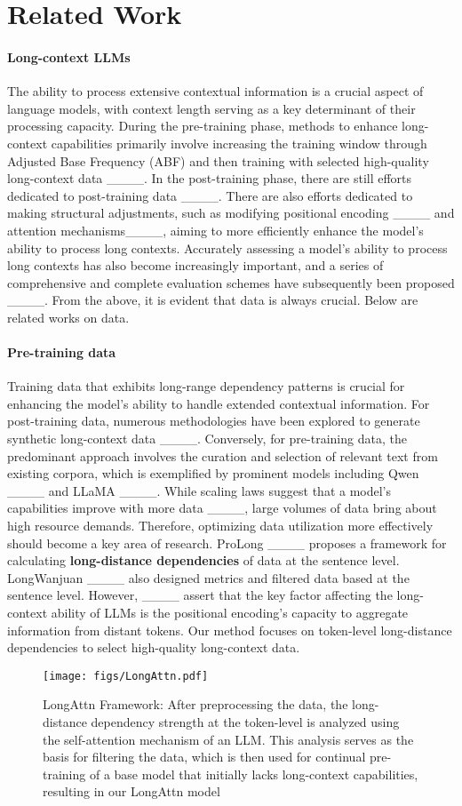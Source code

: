 \section{Related Work}
\paragraph{Long-context LLMs} The ability to process extensive contextual information is a crucial aspect of language models, with context length serving as a key determinant of their processing capacity. During the pre-training phase, methods to enhance long-context capabilities primarily involve increasing the training window through Adjusted Base Frequency (ABF) and then training with selected high-quality long-context data ____. In the post-training phase, there are still efforts dedicated to post-training data ____. There are also efforts dedicated to making structural adjustments, such as modifying positional encoding ____ and attention mechanisms____, aiming to more efficiently enhance the model's ability to process long contexts. Accurately assessing a model's ability to process long contexts has also become increasingly important, and a series of comprehensive and complete evaluation schemes have subsequently been proposed ____. From the above, it is evident that data is always crucial. Below are related works on data.

\paragraph{Pre-training data} 
Training data that exhibits long-range dependency patterns is crucial for enhancing the model's ability to handle extended contextual information. For post-training data, numerous methodologies have been explored to generate synthetic long-context data ____. Conversely, for pre-training data, the predominant approach involves the curation and selection of relevant text from existing corpora, which is exemplified by prominent models including Qwen ____ and LLaMA ____. While scaling laws suggest that a model's capabilities improve with more data ____, large volumes of data bring about high resource demands. Therefore, optimizing data utilization more effectively should become a key area of research. ProLong ____ proposes a framework for calculating \textbf{long-distance dependencies} of data at the sentence level. LongWanjuan ____ also designed metrics and filtered data based at the sentence level.
However, ____ assert that the key factor affecting the long-context ability of LLMs is the positional encoding's capacity to aggregate information from distant tokens. Our method focuses on token-level long-distance dependencies to select high-quality long-context data.
\begin{figure*}
  \texttt{[image: figs/LongAttn.pdf]}
  \caption{LongAttn Framework: After preprocessing the data, the long-distance dependency strength at the token-level is analyzed using the self-attention mechanism of an LLM. This analysis serves as the basis for filtering the data, which is then used for continual pre-training of a base model that initially lacks long-context capabilities, resulting in our LongAttn model}
  \label{fig:main}
\end{figure*}